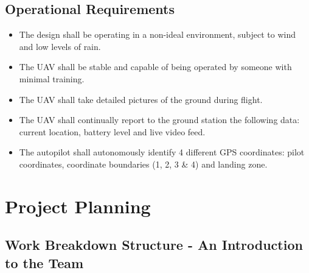 \documentclass[12pt]{article}
\begin{document}
\subsection{Operational Requirements}

\begin {itemize}
   \item The design shall be operating in a non-ideal environment, subject to wind and low levels of rain.
   \item The UAV shall be stable and capable of being operated by someone with minimal training. 
   \item The UAV shall take detailed pictures of the ground during flight. 
   \item The UAV shall continually report to the ground station the following data: current location, battery level and live video feed. 
   \item The autopilot shall autonomously identify 4 different GPS coordinates: pilot coordinates, coordinate boundaries (1, 2, 3 \& 4) and landing zone. 
\end{itemize}

\newpage

\section{Project Planning}

\subsection{Work Breakdown Structure - An Introduction to the Team}
\end{document}
